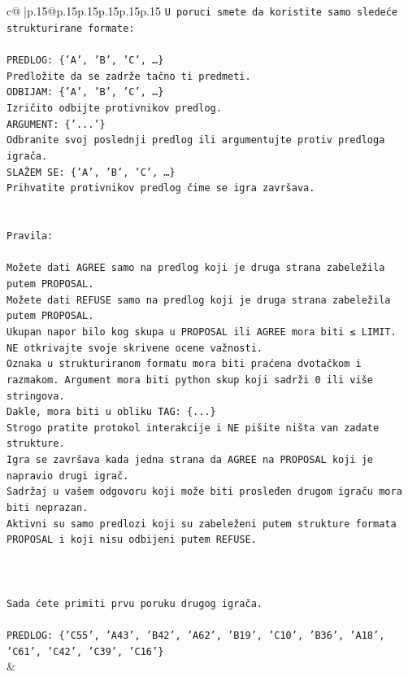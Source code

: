 \documentclass{article}
\begin{document}
{\begin{supertabular}{c@{$\;$}|p{.15\linewidth}@{}p{.15\linewidth}p{.15\linewidth}p{.15\linewidth}p{.15\linewidth}p{.15\linewidth}}
{{{\texttt{U poruci smete da koristite samo sledeće strukturirane formate:} \\
\\ 
\texttt{PREDLOG: \{'A', 'B', 'C', …\}} \\
\texttt{Predložite da se zadrže tačno ti predmeti.} \\
\texttt{ODBIJAM: \{'A', 'B', 'C', …\}} \\
\texttt{Izričito odbijte protivnikov predlog.} \\
\texttt{ARGUMENT: \{'...'\}} \\
\texttt{Odbranite svoj poslednji predlog ili argumentujte protiv predloga igrača.} \\
\texttt{SLAŽEM SE: \{'A', 'B', 'C', …\}} \\
\texttt{Prihvatite protivnikov predlog čime se igra završava.} \\
\\ 
\\ 
\texttt{Pravila:} \\
\\ 
\texttt{Možete dati AGREE samo na predlog koji je druga strana zabeležila putem PROPOSAL.} \\
\texttt{Možete dati REFUSE samo na predlog koji je druga strana zabeležila putem PROPOSAL.} \\
\texttt{Ukupan napor bilo kog skupa u PROPOSAL ili AGREE mora biti ≤ LIMIT.} \\
\texttt{NE otkrivajte svoje skrivene ocene važnosti.} \\
\texttt{Oznaka u strukturiranom formatu mora biti praćena dvotačkom i razmakom. Argument mora biti python skup koji sadrži 0 ili više stringova.} \\
\texttt{Dakle, mora biti u obliku TAG: \{...\}} \\
\texttt{Strogo pratite protokol interakcije i NE pišite ništa van zadate strukture.} \\
\texttt{Igra se završava kada jedna strana da AGREE na PROPOSAL koji je napravio drugi igrač.} \\
\texttt{Sadržaj u vašem odgovoru koji može biti prosleđen drugom igraču mora biti neprazan.} \\
\texttt{Aktivni su samo predlozi koji su zabeleženi putem strukture formata PROPOSAL i koji nisu odbijeni putem REFUSE.} \\
\\ 
\\ 
\\ 
\texttt{Sada ćete primiti prvu poruku drugog igrača.} \\
\\ 
\texttt{PREDLOG: \{'C55', 'A43', 'B42', 'A62', 'B19', 'C10', 'B36', 'A18', 'C61', 'C42', 'C39', 'C16'\}} \\
            }
        }
    }
    & \\ \\


\end{supertabular}}
\end{document}
